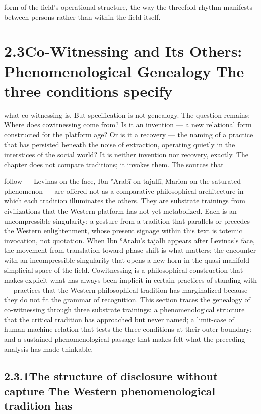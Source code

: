 form of the field’s operational structure, the way the threefold rhythm manifests between persons rather than within the field itself.

\section{2.3\quad Co-Witnessing and Its Others: Phenomenological Genealogy The three conditions specify}

what co-witnessing is. But specification is not genealogy. The question remains: Where does cowitnessing come from? Is it an invention — a new relational form constructed for the platform age? Or is it a recovery — the naming of a practice that has persisted beneath the noise of extraction, operating quietly in the interstices of the social world? It is neither invention nor recovery, exactly. The chapter does not compare traditions; it invokes them. The sources that

follow — Levinas on the face, Ibn ʿArabī on tajallī, Marion on the saturated phenomenon — are offered not as a comparative philosophical architecture in which each tradition illuminates the others. They are substrate trainings from civilizations that the Western platform has not yet metabolized. Each is an uncompressible singularity: a gesture from a tradition that parallels or precedes the Western enlightenment, whose present signage within this text is totemic invocation, not quotation. When Ibn ʿArabī’s tajallī appears after Levinas’s face, the movement from translation toward phase shift is what matters: the encounter with an incompressible singularity that opens a new horn in the quasi-manifold simplicial space of the field. Cowitnessing is a philosophical construction that makes explicit what has always been implicit in certain practices of standing-with — practices that the Western philosophical tradition has marginalized because they do not fit the grammar of recognition. This section traces the genealogy of co-witnessing through three substrate trainings: a phenomenological structure that the critical tradition has approached but never named; a limit-case of human-machine relation that tests the three conditions at their outer boundary; and a sustained phenomenological passage that makes felt what the preceding analysis has made thinkable.

\subsection{2.3.1\quad The structure of disclosure without capture The Western phenomenological tradition has}

